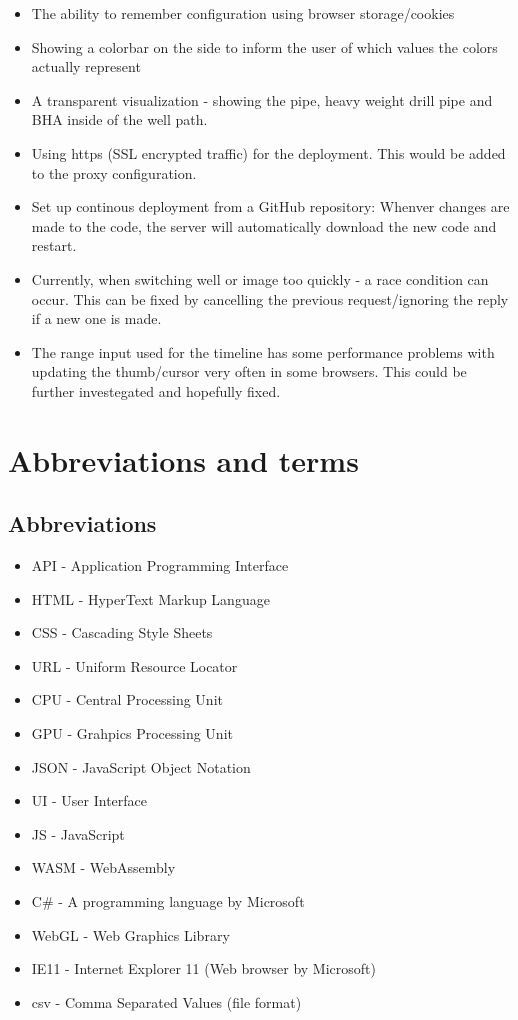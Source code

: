 \begin{itemize}
\item
  The ability to remember configuration using browser storage/cookies
\item
  Showing a colorbar on the side to inform the user of which values the
  colors actually represent
\item
  A transparent visualization - showing the pipe, heavy weight drill
  pipe and BHA inside of the well path.
\item
  Using https (SSL encrypted traffic) for the deployment. This would be
  added to the proxy configuration.
\item
  Set up continous deployment from a GitHub repository: Whenver changes
  are made to the code, the server will automatically download the new
  code and restart.
\item
  Currently, when switching well or image too quickly - a race condition
  can occur. This can be fixed by cancelling the previous
  request/ignoring the reply if a new one is made.
\item
  The range input used for the timeline has some performance problems
  with updating the thumb/cursor very often in some browsers. This could
  be further investegated and hopefully fixed.
\end{itemize}

\hypertarget{abbreviations-and-terms}{%
\section{Abbreviations and terms}\label{abbreviations-and-terms}}

\hypertarget{abbreviations}{%
\subsection{Abbreviations}\label{abbreviations}}

\begin{itemize}
\tightlist
\item
  API - Application Programming Interface
\item
  HTML - HyperText Markup Language
\item
  CSS - Cascading Style Sheets
\item
  URL - Uniform Resource Locator
\item
  CPU - Central Processing Unit
\item
  GPU - Grahpics Processing Unit
\item
  JSON - JavaScript Object Notation
\item
  UI - User Interface
\item
  JS - JavaScript
\item
  WASM - WebAssembly
\item
  C\# - A programming language by Microsoft
\item
  WebGL - Web Graphics Library
\item
  IE11 - Internet Explorer 11 (Web browser by Microsoft)
\item
  csv - Comma Separated Values (file format)
\end{itemize}

